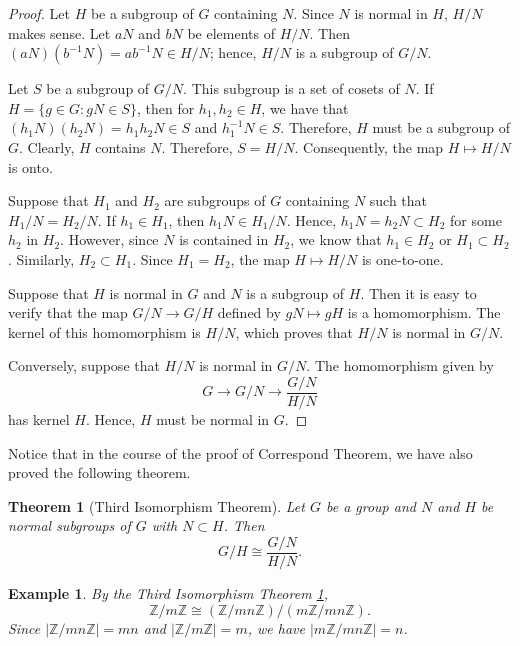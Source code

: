 \documentclass[12pt]{article}
\newtheorem{thm}{Theorem}[section]
\theoremstyle{plain}
\newtheorem{example}{Example}[chapter]
\begin{document}
\begin{proof}
Let $H$ be a subgroup of $G$ containing $N$. Since $N$ is normal in
$H$, $H/N$ makes sense.  Let $aN$ and $bN$ be elements of $H/N$. Then
$(aN)( b^{-1} N )= ab^{-1}N \in H/N$; hence, $H/N$ is a subgroup of
$G/N$.

Let $S$ be a subgroup of $G/N$. This subgroup is a set of cosets of
$N$.  If  $H= \{ g \in G : gN \in S \}$, then for $h_1, h_2 \in H$, we
have that $(h_1 N)( h_2 N )= h_1 h_2 N \in S$ and $h_1^{-1} N \in S$.
Therefore, $H$ must be a subgroup of $G$. Clearly, $H$ contains $N$.
Therefore, $S = H / N$. Consequently, the map  $H \mapsto H/N$ is
onto.

Suppose that $H_1$ and $H_2$ are subgroups of $G$ containing $N$ such
that $H_1/N = H_2/N$. If $h_1 \in H_1$, then $h_1 N \in H_1/N$. Hence,
$h_1 N = h_2 N \subset H_2$ for some $h_2$ in $H_2$. However, since
$N$ is contained in $H_2$, we know that $h_1 \in H_2$ or $H_1 \subset
H_2$. Similarly, $H_2 \subset H_1$.  Since $H_1 = H_2$, the map  $H
\mapsto H/N$ is one-to-one.

Suppose that $H$ is normal in $G$ and $N$ is a subgroup of $H$.  Then
it is easy to verify that the map $G/N \rightarrow G/H$ defined by $gN
\mapsto gH$ is  a homomorphism.  The kernel of this homomorphism is
$H/N$, which proves that $H/N$ is normal in $G/N$.


Conversely, suppose that $H/N$ is normal in $G/N$. The homomorphism
given by
\[
G \rightarrow G/N \rightarrow \frac{G/N}{H/N}
\]
has kernel $H$. Hence, $H$ must be normal in $G$.
\end{proof}

\medskip


Notice that in the course of the proof of Correspond Theorem, we have also
proved the following theorem.


\begin{thm}[Third Isomorphism Theorem]\label{ThirdIsoTheorem}
Let $G$ be a group and $N$ and $H$ be normal subgroups of $G$ with $N
\subset H$.  Then
\[
G/H \cong \frac{G/N}{H/N}.
\]
\end{thm}


\begin{example}
By the Third Isomorphism Theorem \ref{ThirdIsoTheorem},
\[
{\mathbb Z} / m {\mathbb Z} \cong ({\mathbb Z}/ mn {\mathbb Z})/ (m {\mathbb Z}/ mn
{\mathbb Z}).
\]
Since $| {\mathbb Z} / mn {\mathbb Z} | = mn$ and  $|{\mathbb Z} / m{\mathbb Z}| =
m$, we have $| m {\mathbb Z} / mn {\mathbb Z}| = n$.
\end{example}
\end{document}
